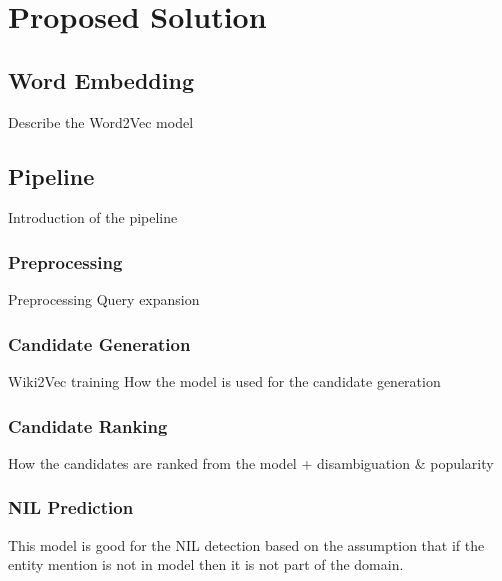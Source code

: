 \chapter{Proposed Solution}

\section{Word Embedding}
Describe the Word2Vec model
\section{Pipeline}
Introduction of the pipeline
\subsection{Preprocessing}
Preprocessing
Query expansion
\subsection{Candidate Generation}
Wiki2Vec training
How the model is used for the candidate generation
\subsection{Candidate Ranking}
How the candidates are ranked from the model + disambiguation \& popularity
\subsection{NIL Prediction}
This model is good for the NIL detection based on the assumption that if the entity mention is not in model then it is not part of the domain.